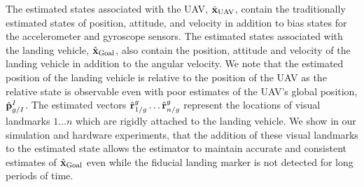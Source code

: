 The estimated states associated with the UAV, $\hat{\boldsymbol{\mathrm{x}}}_{\text{UAV}}$,
contain the traditionally estimated states of position, attitude, and velocity
in addition to bias states for the accelerometer and gyroscope sensors. The
estimated states associated with the landing vehicle,
$\hat{\boldsymbol{\mathrm{x}}}_{\text{Goal}}$, also contain the position, attitude and velocity
of the landing vehicle in addition to the angular velocity. We note that the
estimated position of the landing vehicle is relative to the position of the UAV
as the relative state is observable even with poor estimates of the UAV's global
position, $\hat{\boldsymbol{\mathrm{p}}}_{g/I}^I$.
The estimated vectors $\hat{\boldsymbol{\mathrm{r}}}_{1/g}^{g} \dots \hat{\boldsymbol{\mathrm{r}}}_{n/g}^{g}$ represent the
locations of visual landmarks $1 \dots n$ which are rigidly attached to the
landing vehicle. We show in our simulation and hardware experiments, that the
addition of these visual landmarks to the estimated state allows the estimator
to maintain accurate and consistent estimates of $\hat{\boldsymbol{\mathrm{x}}}_{\text{Goal}}$ even
while the fiducial landing marker is not detected for long periods of time. 


